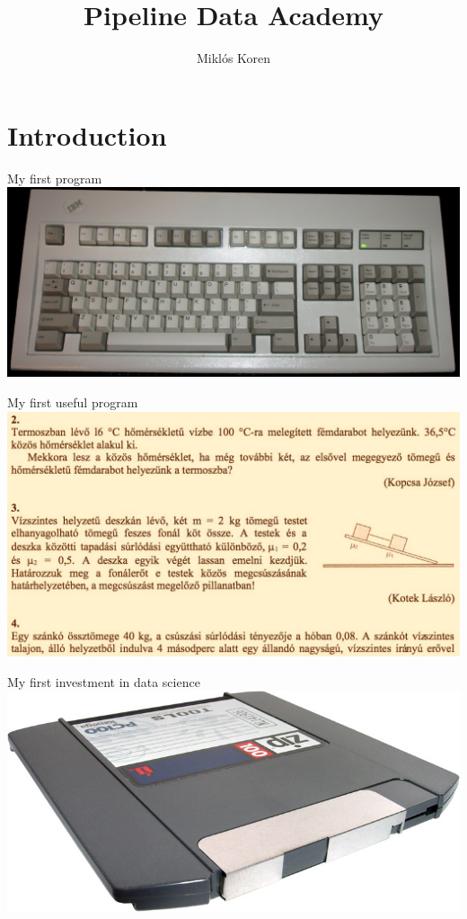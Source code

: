 \documentclass[
  ignorenonframetext,
  aspectratio=54,
]{beamer}
\title{Pipeline Data Academy}
\author{Miklós Koren}
\date{}
\begin{document}
\frame{\titlepage}

\hypertarget{introduction}{%
\section{Introduction}\label{introduction}}

\begin{frame}{My first program}
\protect\hypertarget{my-first-program}{}
\includegraphics{assets/img/keyboard.jpg}
\end{frame}

\begin{frame}{My first useful program}
\protect\hypertarget{my-first-useful-program}{}
\includegraphics{assets/img/stencil.png}
\end{frame}

\begin{frame}{My first investment in data science}
\protect\hypertarget{my-first-investment-in-data-science}{}
\includegraphics{assets/img/zipdrive.jpg}
\end{frame}
\end{document}
